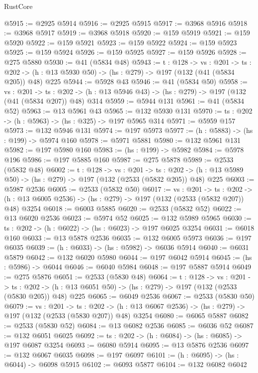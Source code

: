 \begin{lexlean}{RustCore}
\begin{coremodule}
@5915 := @2925 @5914
@5916 := @2925 @5915
@5917 := @3968 @5916
@5918 := @3968 @5917
@5919 := @3968 @5918
@5920 := @159 @5919
@5921 := @159 @5920
@5922 := @159 @5921
@5923 := @159 @5922
@5924 := @159 @5923
@5925 := @159 @5924
@5926 := @159 @5925
@5927 := @159 @5926
@5928 := @275 @5880
@5930 := @41 (@5834 @48)
@5943 := {t : @128} ->
  {vs : @201} ->
  {ts : @202} -> (h : @13 @5930 @50) -> (hs : @279) -> @197 (@132 (@41 (@5834 @205)) @48) @225
@5944 := @5928 @43
@5946 := @41 (@5834 @50)
@5958 := {vs : @201} ->
  {ts : @202} -> (h : @13 @5946 @43) -> (hs : @279) -> @197 (@132 (@41 (@5834 @207)) @48) @314
@5959 := @5944 @131
@5961 := @41 (@5834 @52)
@5963 := @13 @5961 @43
@5965 := @132 @5930 @131
@5970 := {ts : @202} -> (h : @5963) -> (hs : @325) -> @197 @5965 @314
@5971 := @5959 @157
@5973 := @132 @5946 @131
@5974 := @197 @5973
@5977 := (h : @5883) -> (hs : @199) -> @5974 @160
@5978 := @5971 @5881
@5980 := @132 @5961 @131
@5982 := @197 @5980 @160
@5983 := (hs : @199) -> @5982
@5984 := @5978 @196
@5986 := @197 @5885 @160
@5987 := @275 @5878
@5989 := @2533 (@5832 @48)
@6002 := {t : @128} ->
  {vs : @201} ->
  {ts : @202} -> (h : @13 @5989 @50) -> (hs : @279) -> @197 (@132 (@2533 (@5832 @205)) @48) @225
@6003 := @5987 @2536
@6005 := @2533 (@5832 @50)
@6017 := {vs : @201} ->
  {ts : @202} -> (h : @13 @6005 @2536) -> (hs : @279) -> @197 (@132 (@2533 (@5832 @207)) @48) @3254
@6018 := @6003 @5885
@6020 := @2533 (@5832 @52)
@6022 := @13 @6020 @2536
@6023 := @5974 @52
@6025 := @132 @5989 @5965
@6030 := {ts : @202} -> (h : @6022) -> (hs : @6023) -> @197 @6025 @3254
@6031 := @6018 @160
@6033 := @13 @5878 @2536
@6035 := @132 @6005 @5973
@6036 := @197 @6035
@6039 := (h : @6033) -> (hs : @5982) -> @6036 @5914
@6040 := @6031 @5879
@6042 := @132 @6020 @5980
@6044 := @197 @6042 @5914
@6045 := (hs : @5986) -> @6044
@6046 := @6040 @5984
@6048 := @197 @5887 @5914
@6049 := @275 @5876
@6051 := @2533 (@5830 @48)
@6064 := {t : @128} ->
  {vs : @201} ->
  {ts : @202} -> (h : @13 @6051 @50) -> (hs : @279) -> @197 (@132 (@2533 (@5830 @205)) @48) @225
@6065 := @6049 @2536
@6067 := @2533 (@5830 @50)
@6079 := {vs : @201} ->
  {ts : @202} -> (h : @13 @6067 @2536) -> (hs : @279) -> @197 (@132 (@2533 (@5830 @207)) @48) @3254
@6080 := @6065 @5887
@6082 := @2533 (@5830 @52)
@6084 := @13 @6082 @2536
@6085 := @6036 @52
@6087 := @132 @6051 @6025
@6092 := {ts : @202} -> (h : @6084) -> (hs : @6085) -> @197 @6087 @3254
@6093 := @6080 @5914
@6095 := @13 @5876 @2536
@6097 := @132 @6067 @6035
@6098 := @197 @6097
@6101 := (h : @6095) -> (hs : @6044) -> @6098 @5915
@6102 := @6093 @5877
@6104 := @132 @6082 @6042

\end{coremodule}
\end{lexlean}

